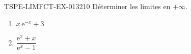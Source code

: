 \begin{exercice}{TSPE-LIMFCT-EX-013}{2}{10}
Déterminer les limites en $+\infty$.
\begin{enumerate}
  \item $x\,\mathrm{e}^{-x} + 3$
  \item $\dfrac{\mathrm{e}^x + x}{\mathrm{e}^x - 1}$
\end{enumerate}
\end{exercice}
